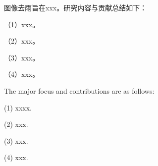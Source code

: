 

\begin{cnabstract}

图像去雨旨在xxx。研究内容与贡献总结如下：


（1）xxx。


（2）xxx。

（3）xxx。

（4）xxx。 

\end{cnabstract}

\begin{center}{\songti{}  \par}\end{center}

\noindent{}



\begin{enabstract}

The major focus and contributions are as follows:


(1) xxxx.

(2) xxx.

(3) xxx. 


(4) xxx.
 


\end{enabstract}

\begin{center}{\songti{}  \par}\end{center}

\noindent{}


